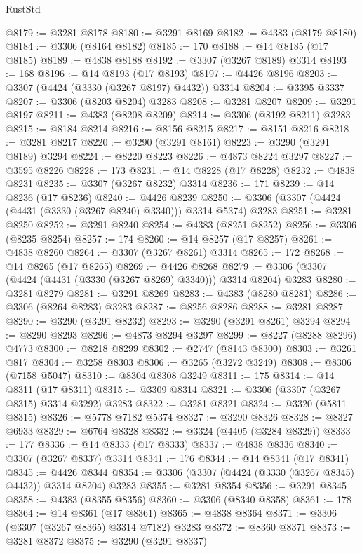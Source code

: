 \begin{lexlean}{RustStd}
\begin{coremodule}
@8179 := @3281 @8178
@8180 := @3291 @8169
@8182 := @4383 (@8179 @8180)
@8184 := @3306 (@8164 @8182)
@8185 := 170
@8188 := @14 @8185 (@17 @8185)
@8189 := @4838 @8188
@8192 := @3307 (@3267 @8189) @3314
@8193 := 168
@8196 := @14 @8193 (@17 @8193)
@8197 := @4426 @8196
@8203 := @3307 (@4424 (@3330 (@3267 @8197) @4432)) @3314
@8204 := @3395 @3337
@8207 := @3306 (@8203 @8204) @3283
@8208 := @3281 @8207
@8209 := @3291 @8197
@8211 := @4383 (@8208 @8209)
@8214 := @3306 (@8192 @8211) @3283
@8215 := @8184 @8214
@8216 := @8156 @8215
@8217 := @8151 @8216
@8218 := @3281 @8217
@8220 := @3290 (@3291 @8161)
@8223 := @3290 (@3291 @8189) @3294
@8224 := @8220 @8223
@8226 := @4873 @8224 @3297
@8227 := @3595 @8226
@8228 := 173
@8231 := @14 @8228 (@17 @8228)
@8232 := @4838 @8231
@8235 := @3307 (@3267 @8232) @3314
@8236 := 171
@8239 := @14 @8236 (@17 @8236)
@8240 := @4426 @8239
@8250 := @3306 (@3307 (@4424 (@4431 (@3330 (@3267 @8240) @3340))) @3314 @5374) @3283
@8251 := @3281 @8250
@8252 := @3291 @8240
@8254 := @4383 (@8251 @8252)
@8256 := @3306 (@8235 @8254)
@8257 := 174
@8260 := @14 @8257 (@17 @8257)
@8261 := @4838 @8260
@8264 := @3307 (@3267 @8261) @3314
@8265 := 172
@8268 := @14 @8265 (@17 @8265)
@8269 := @4426 @8268
@8279 := @3306 (@3307 (@4424 (@4431 (@3330 (@3267 @8269) @3340))) @3314 @8204) @3283
@8280 := @3281 @8279
@8281 := @3291 @8269
@8283 := @4383 (@8280 @8281)
@8286 := @3306 (@8264 @8283) @3283
@8287 := @8256 @8286
@8288 := @3281 @8287
@8290 := @3290 (@3291 @8232)
@8293 := @3290 (@3291 @8261) @3294
@8294 := @8290 @8293
@8296 := @4873 @8294 @3297
@8299 := @8227 (@8288 @8296) @4773
@8300 := @8218 @8299
@8302 := @2747 (@8143 @8300)
@8303 := @3261 @817
@8304 := @3258 @8303
@8306 := @3265 (@3272 @3249)
@8308 := @8306 (@7158 @5047)
@8310 := @8304 @8308 @3249
@8311 := 175
@8314 := @14 @8311 (@17 @8311)
@8315 := @3309 @8314
@8321 := @3306 (@3307 (@3267 @8315) @3314 @3292) @3283
@8322 := @3281 @8321
@8324 := @3320 (@5811 @8315)
@8326 := @5778 @7182 @5374
@8327 := @3290 @8326
@8328 := @8327 @6933
@8329 := @6764 @8328
@8332 := @3324 (@4405 (@3284 @8329))
@8333 := 177
@8336 := @14 @8333 (@17 @8333)
@8337 := @4838 @8336
@8340 := @3307 (@3267 @8337) @3314
@8341 := 176
@8344 := @14 @8341 (@17 @8341)
@8345 := @4426 @8344
@8354 := @3306 (@3307 (@4424 (@3330 (@3267 @8345) @4432)) @3314 @8204) @3283
@8355 := @3281 @8354
@8356 := @3291 @8345
@8358 := @4383 (@8355 @8356)
@8360 := @3306 (@8340 @8358)
@8361 := 178
@8364 := @14 @8361 (@17 @8361)
@8365 := @4838 @8364
@8371 := @3306 (@3307 (@3267 @8365) @3314 @7182) @3283
@8372 := @8360 @8371
@8373 := @3281 @8372
@8375 := @3290 (@3291 @8337)

\end{coremodule}
\end{lexlean}
